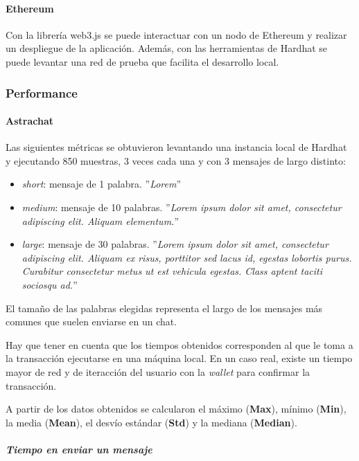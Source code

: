 \paragraph{Ethereum}
Con la librería web3.js se puede interactuar con un nodo de Ethereum y realizar un despliegue de la aplicación. Además, con las herramientas de Hardhat se puede levantar una red de prueba que facilita el desarrollo local.

\subsubsection{Performance\label{performance-blockchain}}

\paragraph{Astrachat}

Las siguientes métricas se obtuvieron levantando una instancia local de Hardhat \cite{hardhat} y ejecutando 850 muestras, 3 veces cada una y con 3 mensajes de largo distinto:

\begin{itemize}
    \item \textit{short}: mensaje de 1 palabra. ''\textit{Lorem}''
    \item \textit{medium}: mensaje de 10 palabras. ''\textit{Lorem ipsum dolor sit amet, consectetur adipiscing elit. Aliquam elementum.}''
    \item \textit{large}: mensaje de 30 palabras. ''\textit{Lorem ipsum dolor sit amet, consectetur adipiscing elit. Aliquam ex risus, porttitor sed lacus id, egestas lobortis purus. Curabitur consectetur metus ut est vehicula egestas. Class aptent taciti sociosqu ad.}''
\end{itemize}

El tamaño de las palabras elegidas representa el largo de los mensajes más comunes que suelen enviarse en un chat.

Hay que tener en cuenta que los tiempos obtenidos corresponden al que le toma a la transacción ejecutarse en una máquina local. En un caso real, existe un tiempo mayor de red y de iteracción del usuario con la \textit{wallet} para confirmar la transacción.

A partir de los datos obtenidos se calcularon el máximo (\textbf{Max}), mínimo (\textbf{Min}), la media (\textbf{Mean}), el desvío estándar (\textbf{Std}) y la mediana (\textbf{Median}).

\subparagraph{Tiempo en enviar un mensaje}

